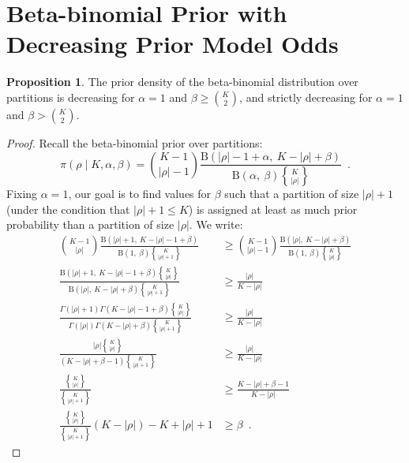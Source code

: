 \documentclass[11pt,a4paper]{article}
\theoremstyle{definition} %
\newtheorem{prop}{Proposition}
\theoremstyle{case}
\newcommand{\FGamma}[1]{\Gamma\left({#1}\right)}
\newcommand{\FBeta}[2]{\text{B}\left({#1},\ {#2}\right)}
\DeclareRobustCommand{\stirling}{\genfrac\{\}{0pt}{}}
\begin{document}
\section{Beta-binomial Prior with Decreasing Prior Model Odds} \label{ap:decreasing-odds}
\begin{prop}\label{prop:monotonicity}
The prior density of the beta-binomial distribution over partitions is decreasing for $\alpha = 1$ and $\beta \geq \binom{K}{2}$, and strictly decreasing for $\alpha = 1$ and $\beta > \binom{K}{2}$.
\end{prop}

\iffalse
\begin{proof}
Recall the beta-binomial prior over partitions:
\begin{equation}
    \pi(\rho \mid K, \alpha, \beta) = \binom{K - 1}{|\rho| - 1}
    \frac{\FBeta{|\rho| - 1 + \alpha}{K - |\rho| + \beta}}
    {\FBeta{\alpha}{\beta}\stirling{K}{|\rho|}} \enspace .
\end{equation}
Fixing $\alpha = 1$, our goal is to find values for $\beta$ such that a partition of size $|\rho| + 1$ (under the condition that $|\rho| + 1 \leq K$) is assigned at least as much prior probability than a partition of size $|\rho|$. We write:
\begin{align}
    \binom{K - 1}{|\rho|}
    \frac{\FBeta{|\rho| + 1}{K - |\rho| - 1 + \beta}}
    {\FBeta{1}{\beta}\stirling{K}{|\rho| + 1}} &\geq \binom{K - 1}{|\rho| - 1}
    \frac{\FBeta{|\rho|}{K - |\rho| + \beta}}
    {\FBeta{1}{\beta}\stirling{K}{|\rho|}} \\[0.50em]
    \frac{\FBeta{|\rho| + 1}{K - |\rho| - 1 + \beta}\stirling{K}{|\rho|}}
    {\FBeta{|\rho|}{K - |\rho| + \beta}\stirling{K}{|\rho| + 1}} &\geq \frac{|\rho|}{K - |\rho|} \\[0.50em]
    \frac{\FGamma{|\rho| + 1}\FGamma{K - |\rho| - 1 + \beta}\stirling{K}{|\rho|}}
    {\FGamma{|\rho|}\FGamma{K - |\rho| + \beta}\stirling{K}{|\rho| + 1}} &\geq \frac{|\rho|}{K - |\rho|} \\[0.50em]
    \frac{|\rho|\stirling{K}{|\rho|}}
    {(K - |\rho| + \beta - 1)\stirling{K}{|\rho| + 1}} &\geq \frac{|\rho|}{K - |\rho|} \\[0.50em]
    \frac{\stirling{K}{|\rho|}}
    {\stirling{K}{|\rho| + 1}} &\geq \frac{K - |\rho| + \beta - 1}{K - |\rho|} \\[0.50em]
    \frac{\stirling{K}{|\rho|}}
    {\stirling{K}{|\rho| + 1}} (K - |\rho|) - K + |\rho| + 1 &\geq \beta \enspace .
\end{align}
\end{proof}
\end{document}
